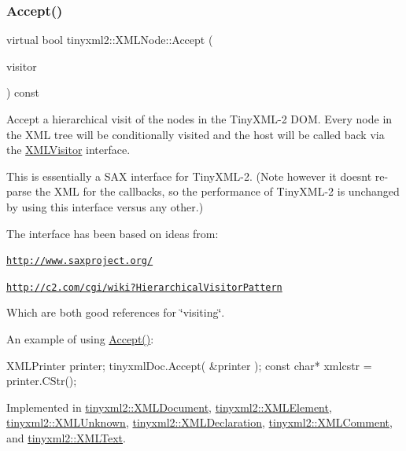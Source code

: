 \subsubsection{\texorpdfstring{Accept()}{Accept()}}
{\footnotesize\ttfamily virtual bool tinyxml2\+::\+X\+M\+L\+Node\+::\+Accept (\begin{DoxyParamCaption}\item[{\mbox{\hyperlink{classtinyxml2_1_1_x_m_l_visitor}{X\+M\+L\+Visitor}} $\ast$}]{visitor }\end{DoxyParamCaption}) const\hspace{0.3cm}{\ttfamily [pure virtual]}}

Accept a hierarchical visit of the nodes in the Tiny\+X\+M\+L-\/2 D\+OM. Every node in the X\+ML tree will be conditionally visited and the host will be called back via the \mbox{\hyperlink{classtinyxml2_1_1_x_m_l_visitor}{X\+M\+L\+Visitor}} interface.

This is essentially a S\+AX interface for Tiny\+X\+M\+L-\/2. (Note however it doesn\textquotesingle{}t re-\/parse the X\+ML for the callbacks, so the performance of Tiny\+X\+M\+L-\/2 is unchanged by using this interface versus any other.)

The interface has been based on ideas from\+:


\begin{DoxyItemize}
\item \href{http://www.saxproject.org/}{\tt http\+://www.\+saxproject.\+org/}
\item \href{http://c2.com/cgi/wiki?HierarchicalVisitorPattern}{\tt http\+://c2.\+com/cgi/wiki?\+Hierarchical\+Visitor\+Pattern}
\end{DoxyItemize}

Which are both good references for \char`\"{}visiting\char`\"{}.

An example of using \mbox{\hyperlink{classtinyxml2_1_1_x_m_l_node_a81e66df0a44c67a7af17f3b77a152785}{Accept()}}\+: \begin{DoxyVerb}XMLPrinter printer;
tinyxmlDoc.Accept( &printer );
const char* xmlcstr = printer.CStr();
\end{DoxyVerb}
 

Implemented in \mbox{\hyperlink{classtinyxml2_1_1_x_m_l_document_ab7be651917a35ab1ff0e4e6d4e565cdf}{tinyxml2\+::\+X\+M\+L\+Document}}, \mbox{\hyperlink{classtinyxml2_1_1_x_m_l_element_a9b2119831e8b85827d5d3e5076788e4a}{tinyxml2\+::\+X\+M\+L\+Element}}, \mbox{\hyperlink{classtinyxml2_1_1_x_m_l_unknown_a8a06b8c82117ca969a432e17a46830fc}{tinyxml2\+::\+X\+M\+L\+Unknown}}, \mbox{\hyperlink{classtinyxml2_1_1_x_m_l_declaration_acf47629d9fc08ed6f1c164a97bcf794b}{tinyxml2\+::\+X\+M\+L\+Declaration}}, \mbox{\hyperlink{classtinyxml2_1_1_x_m_l_comment_a27b37d16cea01b5329dfbbb4f9508e39}{tinyxml2\+::\+X\+M\+L\+Comment}}, and \mbox{\hyperlink{classtinyxml2_1_1_x_m_l_text_a537c60d7e18fb59c45ac2737a29ac47a}{tinyxml2\+::\+X\+M\+L\+Text}}.

